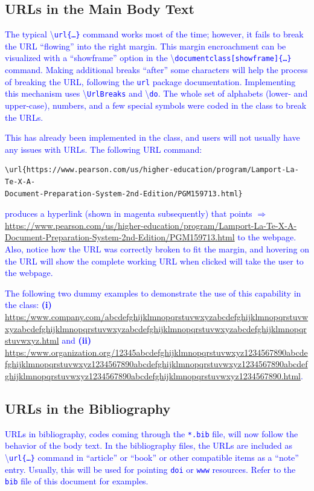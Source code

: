 \documentclass[phd]{ndsu-thesis-2022}
\newcommand\italk[1]{\textcolor{blue}{#1}}  %
\newcommand\cmd[1]{\textbackslash\texttt{#1}}  %
\begin{document}
\subsection{URLs in the Main Body Text}
\italk{The typical \cmd{url\{\ldots\}} command works most of the time; however, it fails to break the URL ``flowing'' into the right margin. This margin encroachment can be visualized with a ``showframe'' option in the \cmd{documentclass[showframe]\{\ldots\}} command. Making additional breaks ``after'' some characters will help the process of breaking the URL, following the \texttt{url} package documentation. Implementing this mechanism uses \cmd{UrlBreaks} and \cmd{do}. The whole set of alphabets (lower- and upper-case), numbers, and a few special symbols were coded in the class to break the URLs.} 

\italk{This has already been implemented in the class, and users will not usually have any issues with URLs. The following URL command:}

\vspace{-2ex}
\begin{verbatim}
\url{https://www.pearson.com/us/higher-education/program/Lamport-La-Te-X-A-
Document-Preparation-System-2nd-Edition/PGM159713.html}
\end{verbatim}

\vspace{-2ex}
\noindent \italk{produces a hyperlink (shown in magenta subsequently) that points $\Rightarrow$ }\textcolor{magenta}{\url{https://www.pearson.com/us/higher-education/program/Lamport-La-Te-X-A-Document-Preparation-System-2nd-Edition/PGM159713.html}} \italk{to the webpage. Also, notice how the URL was correctly broken to fit the margin, and hovering on the URL will show the complete working URL when clicked will take the user to the webpage.}

\italk{The following two dummy examples to demonstrate the use of this capability in the class: \textbf{(i)} \url{https:/www.company.com/abcdefghijklmnopqrstuvwxyzabcdefghijklmnopqrstuvwxyzabcdefghijklmnopqrstuvwxyzabcdefghijklmnopqrstuvwxyzabcdefghijklmnopqrstuvwxyz.html} and \textbf{(ii)}
\url{https:/www.organization.org/12345abcdefghijklmnopqrstuvwxyz1234567890abcdefghijklmnopqrstuvwxyz1234567890abcdefghijklmnopqrstuvwxyz1234567890abcdefghijklmnopqrstuvwxyz1234567890abcdefghijklmnopqrstuvwxyz1234567890.html}. 
}


\subsection{URLs in the Bibliography}
\italk{URLs in bibliography, codes coming through the \texttt{*.bib} file, will now follow the behavior of the body text. In the bibliography files, the URLs are included as \cmd{url\{\ldots\}} command in ``article'' or ``book'' or other compatible items as a ``note'' entry. Usually, this will be used for pointing \texttt{doi} or \texttt{www} resources. Refer to the \texttt{bib} file of this document for examples.}
\end{document}
